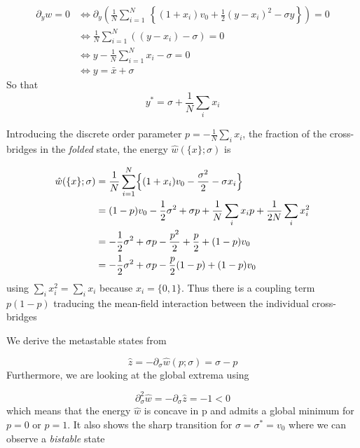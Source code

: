 \documentclass{article}
\begin{document}
\begin{align*}
    \partial_y w = 0 &\Longleftrightarrow \partial_y \left( \frac{1}{N} \sum_{i=1}^N \,\left\lbrace (1+x_i)v_0 + \frac{1}{2} (y-x_i)^2 - \sigma y \right\rbrace \right) = 0 \\
    &\Longleftrightarrow \frac{1}{N} \sum_{i=1}^N \left( (y-x_i) - \sigma \right) = 0 \\
    &\Longleftrightarrow y - \frac{1}{N} \sum_{i=1}^N x_i - \sigma = 0 \\
    &\Longleftrightarrow y = \bar{x} + \sigma
\end{align*}
So that 
\begin{equation}
    \boxed{y^* = \sigma + \frac{1}{N}\sum_i x_i}
\end{equation}

Introducing the discrete order parameter $p = - \frac{1}{N} \sum_i x_i$, the fraction of the cross-bridges in the \textit{folded} state, the energy $\hat{w} (\lbrace x \rbrace ; \sigma)$ is

\begin{align*}
\hat{w} (\{x\} ; \sigma) &= \frac{1}{N} \sum_{i=1}^N \Bigl\{ (1+x_i)v_0 - \frac{\sigma^2}{2} - \sigma x_i \Bigr\} \\
&= (1-p) v_0 -\frac{1}{2}\sigma^2 + \sigma p + \frac{1}{N}\sum_i x_i p + \frac{1}{2N}\sum_i x_i^2 \\
&= -\frac{1}{2}\sigma^2 + \sigma p -\frac{p^2}{2} + \frac{p}{2} + (1-p)v_0 \\
&= -\frac{1}{2}\sigma^2 + \sigma p -\frac{p}{2}(1-p) + (1-p)v_0
\end{align*}
 using $\sum_i x_i^2 = \sum_i x_i$ because $x_i =\lbrace0,1\rbrace$. Thus there is a coupling term $p(1-p)$ traducing the mean-field interaction between the individual cross-bridges

We derive the metastable states from

\begin{equation}
    \hat{z} = -\partial_{\sigma} \hat{w} (p ; \sigma) =\sigma - p
\end{equation}
Furthermore, we are looking at the global extrema using 

\begin{equation}
    \partial^2_{\sigma} \hat{w} = - \partial_{\sigma} \hat{z} = - 1 < 0 
\end{equation}
which means that the energy $\hat{w}$ is concave in p and admits a global minimum for $p =0 $ or $p=1$. 
It also shows the sharp transition for $\sigma = \sigma^* = v_0$ where we can observe a \textit{bistable} state 
\end{document}
